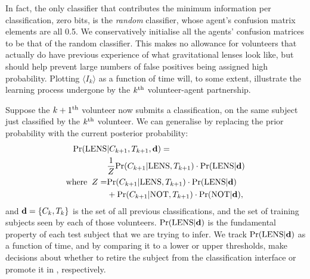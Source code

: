 \documentclass[useAMS,usenatbib,a4paper]{mn2e}
\begin{document}
In fact, the only classifier that contributes the minimum information per
classification, zero bits, is the {\it random} classifier, whose agent's
confusion matrix elements are all 0.5.   
We conservatively initialise all the agents' confusion matrices to be that of
the random classifier. This makes no allowance for volunteers that actually do
have previous experience of what gravitational lenses look like, but should
help prevent large numbers of false positives being assigned high probability.
Plotting  $\langle I_k \rangle$ as a function of time will, to some extent,
illustrate the
learning process undergone by the $k^{\rm th}$ volunteer-agent partnership.

Suppose the $k+1^{\rm th}$ volunteer now submits a classification, on the same
subject just classified by the $k^{\rm th}$ volunteer. We can generalise
 by replacing the prior probability with the current
posterior probability:
\begin{align}
  \label{eq:app:update}
  {\rm Pr}({\rm LENS} & |C_{k+1},T_{k+1},{\mathbf{d}}) = \\
  & \frac{1}{Z} {\rm Pr}(C_{k+1}|{\rm LENS},T_{k+1}) \cdot {\rm Pr}({\rm LENS}|{\mathbf{d}}) \\ \notag
{\rm where}\;\; Z = & {\rm Pr}(C_{k+1}|{\rm LENS},T_{k+1})\cdot{\rm Pr}({\rm LENS}|{\mathbf{d}}) \\ \notag
      & + {\rm Pr}(C_{k+1}|{\rm NOT},T_{k+1})\cdot{\rm Pr}({\rm NOT}|{\mathbf{d}}), \notag
\end{align}
and ${\mathbf{d}} = \{C_k,T_k\}$ is the set of all previous
classifications, and the set of training subjects seen by each of those
volunteers.
${\rm Pr}({\rm LENS}|{\mathbf{d}})$ is the fundamental property of each test subject that
we are trying to infer. We track ${\rm Pr}({\rm LENS}|{\mathbf{d}})$ as a function of time,
and by comparing it to a lower or upper thresholds, make decisions about
whether to retire the subject from the classification interface or
promote it in \Talk, respectively.







% 






\label{lastpage}
\bsp
\end{document}

